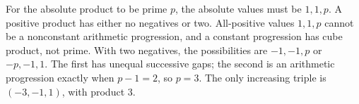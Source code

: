For the absolute product to be prime $ p $, the absolute values must be $ 1,1,p $. A positive product has either no negatives or two. All-positive values $ 1,1,p $ cannot be a nonconstant arithmetic progression, and a constant progression has cube product, not prime. With two negatives, the possibilities are $-1,-1,p $ or $-p,-1,1 $. The first has unequal successive gaps; the second is an arithmetic progression exactly when $ p-1=2 $, so $ p=3 $. The only increasing triple is $\boxed{(-3,-1,1)}$, with product 3.
